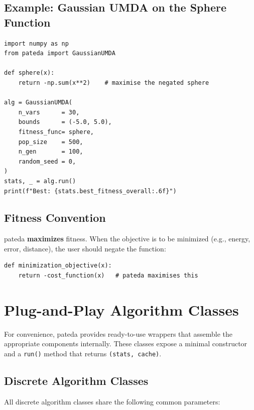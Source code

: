 \documentclass[a4paper,11pt]{article}
\begin{document}
\subsection{Example: Gaussian UMDA on the Sphere Function}
\label{ex:gumda_sphere}

\begin{lstlisting}
import numpy as np
from pateda import GaussianUMDA

def sphere(x):
    return -np.sum(x**2)    # maximise the negated sphere

alg = GaussianUMDA(
    n_vars      = 30,
    bounds      = (-5.0, 5.0),
    fitness_func= sphere,
    pop_size    = 500,
    n_gen       = 100,
    random_seed = 0,
)
stats, _ = alg.run()
print(f"Best: {stats.best_fitness_overall:.6f}")
\end{lstlisting}

\subsection{Fitness Convention}

pateda \textbf{maximizes} fitness.  When the objective is to be minimized (e.g., energy, error, distance), the user should negate the function:

\begin{lstlisting}
def minimization_objective(x):
    return -cost_function(x)   # pateda maximises this
\end{lstlisting}

\section{Plug-and-Play Algorithm Classes}
\label{sec:algorithms}

For convenience, pateda provides ready-to-use wrappers that assemble the appropriate components internally.  These classes expose a minimal constructor and a \texttt{run()} method that returns \texttt{(stats, cache)}.

\subsection{Discrete Algorithm Classes}

All discrete algorithm classes share the following common parameters:
\end{document}

